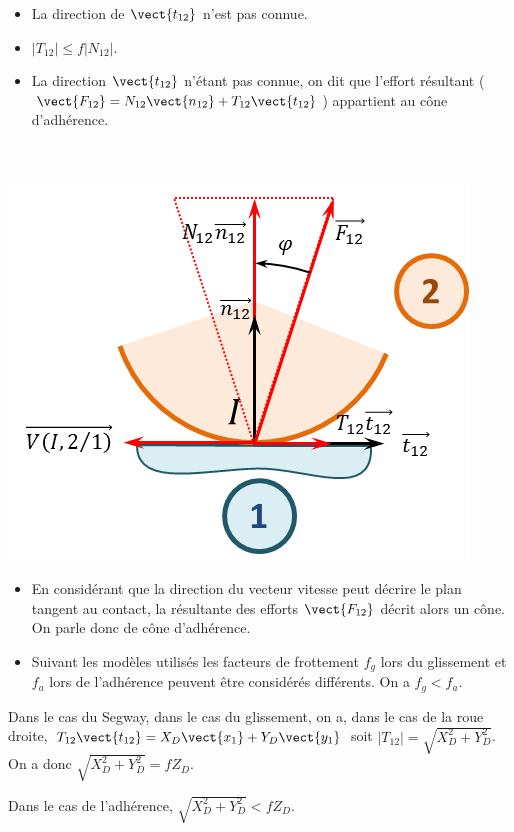 \documentclass[10pt,fleqn]{article} %
\begin{document}
\begin{corrige}
\begin{minipage}[t]{.35\linewidth}
\begin{itemize}
\item La direction de $\vect{t_{12}}$ n'est pas connue. 
\item $|T_{12}| \leq f |N_{12}|$.
\item La direction $\vect{t_{12}}$ n'étant pas connue, on dit que l'effort résultant ($\vect{F_{12}}=N_{12} \vect{n_{12}}+T_{12} \vect{t_{12}}$) appartient au cône d'adhérence. 
\end{itemize}
\end{minipage}\hfill
\begin{minipage}[t]{.29\linewidth}
$\quad$
\begin{center}
\includegraphics[width=\linewidth]{cor_05}
\end{center}
\end{minipage}

\begin{rem}
\begin{itemize}
\item En considérant que la direction du vecteur vitesse peut décrire le plan tangent au contact, la résultante des efforts $\vect{F_{12}}$ décrit alors un cône. On parle donc de cône d'adhérence. 
\item Suivant les modèles utilisés les facteurs de frottement $f_g$ lors du glissement et $f_a$ lors de l'adhérence peuvent être considérés différents. On a $f_g<f_a$.
\end{itemize}
\end{rem}

Dans le cas du Segway, dans le cas du glissement, on a, dans le cas de la roue droite, $T_{12} \vect{t_{12}} = X_D\vect{x_1}+Y_D\vect{y_1} $ soit $|T_{12}| =\sqrt{X_D^2+Y_D^2}$. On a donc 
$\sqrt{X_D^2+Y_D^2} = f Z_D$. 

Dans le cas de l'adhérence, $\sqrt{X_D^2+Y_D^2} < f Z_D$.
\end{corrige}
\else
\fi
\end{document}
